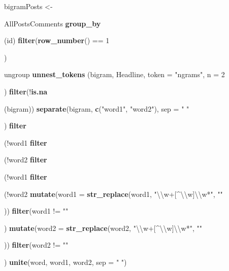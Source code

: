 \documentclass[]{article}
\newenvironment{Shaded}{\begin{snugshade}}{\end{snugshade}}
\newcommand{\KeywordTok}[1]{\textcolor[rgb]{0.13,0.29,0.53}{\textbf{{#1}}}}
\newcommand{\DataTypeTok}[1]{\textcolor[rgb]{0.13,0.29,0.53}{{#1}}}
\newcommand{\DecValTok}[1]{\textcolor[rgb]{0.00,0.00,0.81}{{#1}}}
\newcommand{\CharTok}[1]{\textcolor[rgb]{0.31,0.60,0.02}{{#1}}}
\newcommand{\StringTok}[1]{\textcolor[rgb]{0.31,0.60,0.02}{{#1}}}
\newcommand{\CommentTok}[1]{\textcolor[rgb]{0.56,0.35,0.01}{\textit{{#1}}}}
\newcommand{\NormalTok}[1]{{#1}}
\begin{document}
\begin{Shaded}
\begin{Highlighting}[]
\NormalTok{bigramPosts <-}\StringTok{ }\NormalTok{AllPostsComments %>%}
\StringTok{  }\KeywordTok{group_by}\NormalTok{(id) %>%}\StringTok{                }\CommentTok{#from here until ungroup: get rid of duplicate posts}
\StringTok{  }\KeywordTok{filter}\NormalTok{(}\KeywordTok{row_number}\NormalTok{() ==}\StringTok{ }\DecValTok{1}\NormalTok{) %>%}
\StringTok{  }\NormalTok{ungroup %>%}
\StringTok{  }\KeywordTok{unnest_tokens} \NormalTok{(bigram, Headline, }\DataTypeTok{token =} \StringTok{"ngrams"}\NormalTok{, }\DataTypeTok{n =} \DecValTok{2}\NormalTok{) %>%}
\StringTok{  }\KeywordTok{filter}\NormalTok{(!}\KeywordTok{is.na}\NormalTok{(bigram)) %>%}
\StringTok{  }\KeywordTok{separate}\NormalTok{(bigram, }\KeywordTok{c}\NormalTok{(}\StringTok{"word1"}\NormalTok{, }\StringTok{"word2"}\NormalTok{), }\DataTypeTok{sep =} \StringTok{" "}\NormalTok{) %>%}\StringTok{   }\CommentTok{#storing bigram words separately}
\StringTok{  }\KeywordTok{filter}\NormalTok{(!word1 %in%}\StringTok{ }\NormalTok{stp_en$word) %>%}
\StringTok{  }\KeywordTok{filter}\NormalTok{(!word2 %in%}\StringTok{ }\NormalTok{stp_en$word) %>%}
\StringTok{  }\KeywordTok{filter}\NormalTok{(!word1 %in%}\StringTok{ }\NormalTok{stp_spc$word) %>%}
\StringTok{  }\KeywordTok{filter}\NormalTok{(!word2 %in%}\StringTok{ }\NormalTok{stp_spc$word) %>%}
\StringTok{  }\KeywordTok{mutate}\NormalTok{(}\DataTypeTok{word1 =} \KeywordTok{str_replace}\NormalTok{(word1, }\StringTok{"}\CharTok{\textbackslash{}\textbackslash{}}\StringTok{w+[^}\CharTok{\textbackslash{}\textbackslash{}}\StringTok{w]}\CharTok{\textbackslash{}\textbackslash{}}\StringTok{w*"}\NormalTok{, }\StringTok{""}\NormalTok{)) %>%}\StringTok{   }\CommentTok{#"zte's" was not propoerly filtered by stp_spc}
\StringTok{  }\KeywordTok{filter}\NormalTok{(word1 !=}\StringTok{ ""}\NormalTok{)  %>%}
\StringTok{  }\KeywordTok{mutate}\NormalTok{(}\DataTypeTok{word2 =} \KeywordTok{str_replace}\NormalTok{(word2, }\StringTok{"}\CharTok{\textbackslash{}\textbackslash{}}\StringTok{w+[^}\CharTok{\textbackslash{}\textbackslash{}}\StringTok{w]}\CharTok{\textbackslash{}\textbackslash{}}\StringTok{w*"}\NormalTok{, }\StringTok{""}\NormalTok{)) %>%}\StringTok{   }\CommentTok{#"zte's" was not propoerly filtered by stp_spc}
\StringTok{  }\KeywordTok{filter}\NormalTok{(word2 !=}\StringTok{ ""}\NormalTok{)  %>%}
\StringTok{  }\KeywordTok{unite}\NormalTok{(word, word1, word2, }\DataTypeTok{sep =} \StringTok{" "}\NormalTok{) }

}}}}}}}}}}}}}}}
\end{Highlighting}
\end{Shaded}
\end{document}
